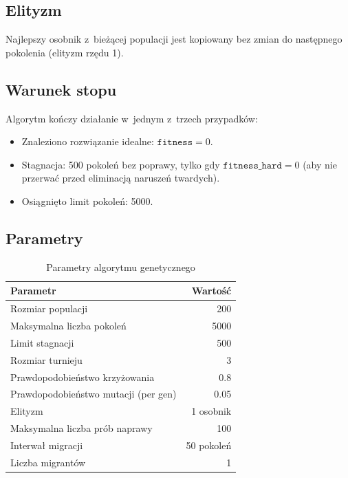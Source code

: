 \documentclass[12pt,a4paper]{article}
\begin{document}
\subsection{Elityzm}

Najlepszy osobnik z~bie\.{z}\k{a}cej populacji jest kopiowany bez zmian do nast\k{e}pnego pokolenia (elityzm rz\k{e}du 1).

\subsection{Warunek stopu}

Algorytm ko\'{n}czy dzia\l{}anie w~jednym z~trzech przypadk\'{o}w:
\begin{itemize}
  \item Znaleziono rozwi\k{a}zanie idealne: $\texttt{fitness} = 0$.
  \item Stagnacja: 500 pokole\'{n} bez poprawy, tylko gdy $\texttt{fitness\_hard} = 0$ (aby nie przerwa\'{c} przed eliminacj\k{a} narusze\'{n} twardych).
  \item Osi\k{a}gni\k{e}to limit pokole\'{n}: 5000.
\end{itemize}

\subsection{Parametry}

\begin{table}[H]
\centering
\begin{tabular}{lr}
\toprule
\textbf{Parametr} & \textbf{Warto\'{s}\'{c}} \\
\midrule
Rozmiar populacji & 200 \\
Maksymalna liczba pokole\'{n} & 5000 \\
Limit stagnacji & 500 \\
Rozmiar turnieju & 3 \\
Prawdopodobie\'{n}stwo krzy\.{z}owania & 0.8 \\
Prawdopodobie\'{n}stwo mutacji (per gen) & 0.05 \\
Elityzm & 1 osobnik \\
Maksymalna liczba pr\'{o}b naprawy & 100 \\
Interwa\l{} migracji & 50 pokole\'{n} \\
Liczba migrant\'{o}w & 1 \\
\bottomrule
\end{tabular}
\caption{Parametry algorytmu genetycznego}
\label{tab:params}
\end{table}
\end{document}
